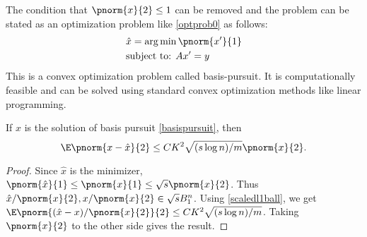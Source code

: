 The condition that $\pnorm{x}{2}\leq 1$ can be removed and the problem can be stated as
 an optimization problem like \eqref{optprob0} as follows:
 \begin{equation}\label{basispursuit}
	 \begin{split}
		 &\hat{x} = \arg\min\pnorm{x'}{1}\\
		 &\text{subject to: } Ax' = y
	 \end{split}
 \end{equation}
 This is a convex optimization problem called basis-pursuit.
 It is computationally feasible and can be solved using standard
 convex optimization methods like linear programming.

\begin{theorem}\label{basispursuiterror}
	If
	$\hat{x}$ is the solution of basis pursuit \eqref{basispursuit},
	then
	\begin{equation*}
		\E\pnorm{x-\hat{x}}{2}\leq 
		CK^2\sqrt{{(s\log n)}/{m}}\pnorm{x}{2}.
	\end{equation*}
\end{theorem}
\begin{proof}
	Since $\hat{x}$ is the minimizer, $\pnorm{\hat{x}}{1}\leq \pnorm{x}{1}\leq \sqrt{s}\pnorm{x}{2}$.
	Thus $\hat{x}/\pnorm{x}{2}, x/\pnorm{x}{2}\in \sqrt{s}B_1^n$.
	Using \eqref{scaledl1ball}, we get
	$\E\pnorm{(\hat{x}-x)/\pnorm{x}{2}}{2}\leq CK^2\sqrt{(s\log n)/m}$.
	Taking $\pnorm{x}{2}$ to the other side gives the result.
\end{proof}

